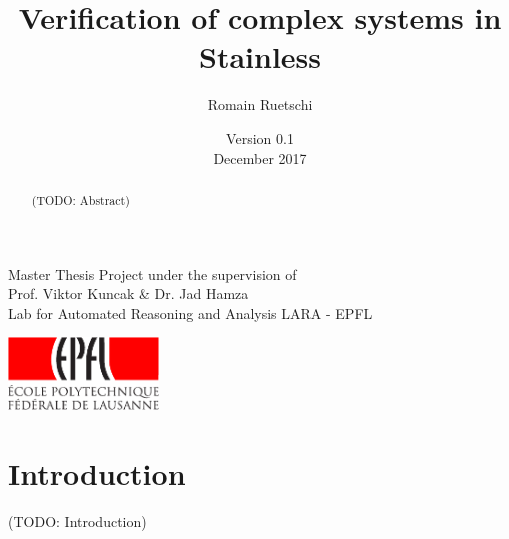 \documentclass[a4paper,twoside]{article}
\title{Verification of complex systems in Stainless}
\date{
  {\small Version 0.1}\\
  December 2017
}
\author{Romain Ruetschi}
\makeatletter
\newcommand*{\flipmargins}{%
  \clearpage
  \setlength{\@tempdima}{\oddsidemargin}%
  \setlength{\oddsidemargin}{\evensidemargin}%
  \setlength{\evensidemargin}{\@tempdima}%
  \if@reversemargin
    \normalmarginpar
  \else
    \reversemarginpar
  \fi
}
\newcommand{\TODO}[1]{\textcolor{YellowOrange}{(TODO: #1)}} %
\makeatother
\begin{document}
\maketitle

\vfill

\begin{abstract}

\TODO{Abstract}

\end{abstract}

\vfill

\begin{center}
    Master Thesis Project under the supervision of \\
    Prof. Viktor Kuncak \& Dr. Jad Hamza \\
    Lab for Automated Reasoning and Analysis LARA - EPFL
\end{center}

\begin{center}
    \includegraphics[width = 40mm]{res/epfl-logo}
\end{center}

\clearpage\null\newpage

\restoregeometry              %
\flipmargins
\pagestyle{mystyle_no_header}

\tableofcontents

\clearpage
\pagestyle{mystyle}


\section{Introduction}

\TODO{Introduction}

%
%
%
%
%
\end{document}
